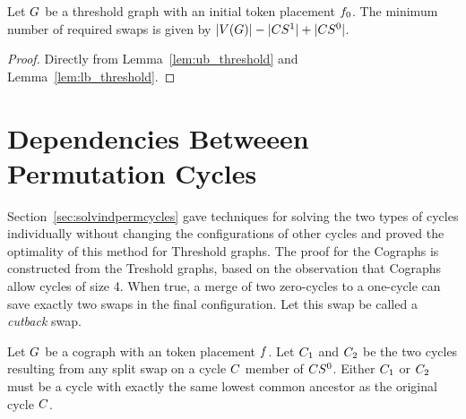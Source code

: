 \documentclass[msc,english,table,xcdraw]{ppgccufmg}
\begin{document}
\begin{theorem}
\label{cor:threshold_pol}
Let $G$ be a threshold graph with an initial token placement $f_{0}$.
The minimum number of required swaps is given by $|V(G)| - |CS^{1}| + |CS^{0}|$.
\end{theorem}

\begin{proof}
Directly from Lemma~\ref{lem:ub_threshold} and Lemma~\ref{lem:lb_threshold}.
\end{proof}

\section{Dependencies Betweeen Permutation Cycles}
\label{sec:deppermcycles}

Section~\ref{sec:solvindpermcycles} gave techniques for solving the two types of 
cycles individually without changing the configurations of other cycles and proved 
the optimality of this method for Threshold graphs.
The proof for the Cographs is constructed from the Treshold graphs, based on the 
observation that Cographs allow cycles of size 4.
When true, a merge of two zero-cycles to a one-cycle can save exactly two swaps
in the final configuration.
Let this swap be called a \textit{cutback} swap.

\begin{lemma}
\label{lem:zero_split}
Let $G$ be a cograph with an  token placement $f$.
Let $C_{1}$ and $C_{2}$ be the two cycles resulting from any split swap 
on a cycle $C$ member of $CS^{0}$. 
Either $C_{1}$ or $C_{2}$ must be a cycle with exactly the same lowest 
common ancestor as the original cycle $C$.
\end{lemma}
\end{document}
